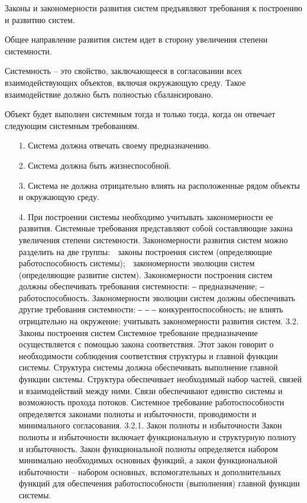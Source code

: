 \documentclass[11pt,a4paper]{article}
\begin{document}
Законы и закономерности развития систем предъявляют требования к построению и
развитию систем.

Общее направление развития систем идет в сторону увеличения степени
системности.

Системность – это свойство, заключающееся в согласовании всех
взаимодействующих объектов, включая окружающую среду.  Такое взаимодействие
должно быть полностью сбалансировано.

Объект будет выполнен системным тогда и только тогда, когда он отвечает
следующим системным требованиям.
\begin{itemize}
\item[1.] Система должна отвечать своему предназначению.
\item[2.] Система должна быть жизнеспособной.
\item[3.] Система не должна отрицательно влиять на расположенные рядом объекты
  и окружающую среду.
\item[4.] При построении системы необходимо учитывать закономерности ее развития.
Системные требования представляют собой составляющие закона увеличения
степени системности.
Закономерности развития систем можно разделить на две группы:
 законы построения систем (определяющие работоспособность системы);
 закономерности эволюции систем (определяющие развитие систем).
Закономерности построения систем должны обеспечивать требования
системности:
‒ предназначение;
‒ работоспособность.
Закономерности эволюции систем должны обеспечивать другие требования
системности:
‒
‒
‒
конкурентоспособность;
не влиять отрицательно на окружение;
учитывать закономерности развития систем.
3.2. Законы построения систем
Системное требование предназначение осуществляется с помощью закона
соответствия. Этот закон говорит о необходимости соблюдения соответствия структуры и
главной функции системы. Структура системы должна обеспечивать выполнение главной
функции системы. Структура обеспечивает необходимый набор частей, связей и
взаимодействий между ними. Связи обеспечивают единство системы и возможность
прохода потоков.
Системное требование работоспособности определяется законами полноты и
избыточности, проводимости и минимального согласования.
3.2.1. Закон полноты и избыточности
Закон полноты и избыточности включает функциональную и структурную полноту
и избыточность.
Закон функциональной полноты определяется набором минимально необходимых
основных функций, а закон функциональной избыточности – набором основных,
вспомогательных и дополнительных функций для обеспечения работоспособности
(выполнения) главной функции системы.

\end{itemize}
\end{document}
